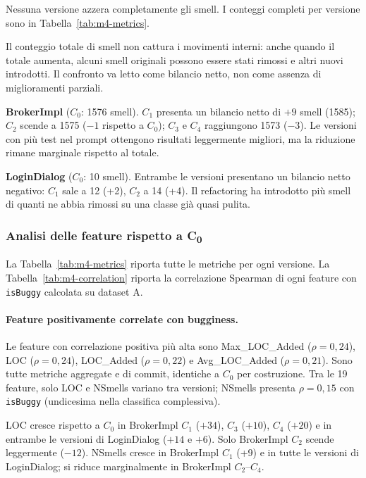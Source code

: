 Nessuna versione azzera completamente gli smell.
I conteggi completi per versione sono in Tabella~\ref{tab:m4-metrics}.

Il conteggio totale di smell non cattura i movimenti interni: anche quando il totale
aumenta, alcuni smell originali possono essere stati rimossi e altri nuovi introdotti.
Il confronto va letto come bilancio netto, non come assenza di miglioramenti parziali.

\textbf{BrokerImpl} ($C_0$: 1576 smell). $C_1$ presenta un bilancio netto di $+9$
smell (1585); $C_2$ scende a 1575 ($-1$ rispetto a $C_0$); $C_3$ e $C_4$ raggiungono
1573 ($-3$). Le versioni con più test nel prompt ottengono risultati leggermente
migliori, ma la riduzione rimane marginale rispetto al totale.

\textbf{LoginDialog} ($C_0$: 10 smell). Entrambe le versioni presentano un bilancio
netto negativo: $C_1$ sale a 12 (+2), $C_2$ a 14 (+4). Il refactoring ha introdotto
più smell di quanti ne abbia rimossi su una classe già quasi pulita.

\subsubsection{Analisi delle feature rispetto a C\textsubscript{0}}

La Tabella~\ref{tab:m4-metrics} riporta tutte le metriche per ogni versione.
La Tabella~\ref{tab:m4-correlation} riporta la correlazione Spearman di ogni feature
con \texttt{isBuggy} calcolata su dataset A.

\paragraph{Feature positivamente correlate con bugginess.}
Le feature con correlazione positiva più alta sono Max\_LOC\_Added ($\rho = 0{,}24$),
LOC ($\rho = 0{,}24$), LOC\_Added ($\rho = 0{,}22$) e Avg\_LOC\_Added ($\rho = 0{,}21$).
Sono tutte metriche aggregate e di commit, identiche a $C_0$ per costruzione.
Tra le 19 feature, solo LOC e NSmells variano tra versioni; NSmells presenta
$\rho = 0{,}15$ con \texttt{isBuggy} (undicesima nella classifica complessiva).

LOC cresce rispetto a $C_0$ in BrokerImpl $C_1$ ($+34$), $C_3$ ($+10$), $C_4$ ($+20$)
e in entrambe le versioni di LoginDialog ($+14$ e $+6$). Solo BrokerImpl $C_2$ scende
leggermente ($-12$). NSmells cresce in BrokerImpl $C_1$ (+9) e in tutte le versioni di
LoginDialog; si riduce marginalmente in BrokerImpl $C_2$--$C_4$.

